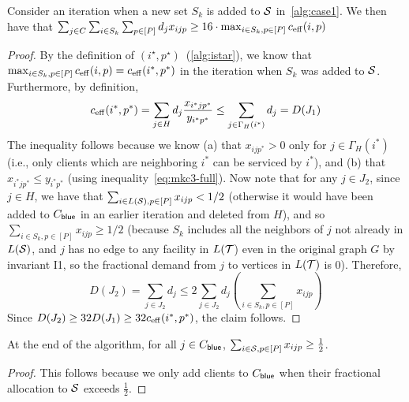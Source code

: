 \begin{claim}\label{clm:imp}
Consider an iteration when a new set $S_k$ is added to ${\cal S}$ in~\cref{alg:case1}. We then have that $\sum_{j\in C} \sum_{i\in S_k}  \sum_{p\in [P]} d_j x_{ijp} \geq 16 \cdot \max_{i\in S_k, p\in [P]} c_{\mathrm{eff}}(i,p) $
\end{claim}
\begin{proof}
By the definition of $(i^\star, p^\star)$~(\cref{alg:istar}), we know that $ \max_{i\in S_k, p\in [P]} c_{\mathrm{eff}}(i,p)  = c_{\mathrm{eff}}(i^*,p^*)$ in the iteration when $S_k$ was added to ${\cal S}$. Furthermore, by definition,
\[c_{\mathrm{eff}}(i^*,p^*) = \sum_{j\in H} d_j \frac{x_{i^*jp^*}}{y_{i^*p^*}} \leq \sum_{j\in \Gamma_H(i^*)} d_j = D(J_1)\]
The inequality follows because we know  (a) that $x_{ijp^*} > 0$ only for $j\in \Gamma_H(i^*)$ (i.e., only clients which are neighboring $i^*$ can be serviced by $i^*$), and (b) that $x_{i^*jp^*} \leq y_{i^*p^*}$ (using inequality~\eqref{eq:mkc3-full}).
Now note that for any $j\in J_2$, since $j\in H$, we have that $\sum_{i\in L({\cal S}), p\in [P]} x_{ijp} < 1/2$ (otherwise it would have been added
to $C_{\mathsf{blue}}$ in an earlier iteration and deleted from $H$), and so $\sum_{i\in S_k, p\in [P]} x_{ijp} \geq 1/2$ (because $S_k$ includes all the neighbors of $j$ not already in $L({\cal S})$, and $j$ has no edge to any facility in $L({\cal T}$) even in the original graph $G$ by invariant I1, so the fractional demand from $j$ to vertices in $L({\cal T})$ is $0$).
Therefore,
\[
D(J_2) = \sum_{j\in J_2} d_j \leq 2 \sum_{j\in J_2} d_j \left(\sum_{i\in S_k, p\in [P]} x_{ijp}\right)
\]
Since $D(J_2) \geq 32D(J_1) \geq 32c_{\mathrm{eff}}(i^*,p^*)$, the claim follows.
\end{proof}


\begin{claim}
	At the end of the algorithm, for all $j \in C_{\mathsf{blue}}$, $\sum_{i \in {\cal S}, p \in [P]} x_{ijp} \geq \frac12$.	
\end{claim}
\begin{proof}
This follows because we only add clients to $C_{\mathsf{blue}}$ when their fractional allocation to ${\cal S}$ exceeds $\frac12$.
\end{proof}



